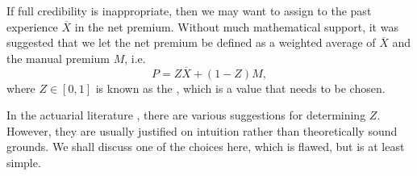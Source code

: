 \documentclass[notoc,notitlepage]{tufte-book}
\begin{document}
If full credibility is inappropriate, then we may want to assign  to the past experience $\overline{X}$ in the net premium. Without
much mathematical support, it was suggested that we let the net premium be
defined as a weighted average of $\overline{X}$ and the manual premium $M$,
i.e.
\begin{equation*}
  P = Z \overline{X} + (1 - Z) M,
\end{equation*}
where $Z \in [0, 1]$ is known as the   , which is a
value that needs to be chosen.

In the actuarial literature \cite{klugman2012}, there are various suggestions
for determining $Z$. However, they are usually justified on intuition rather
than theoretically sound grounds. We shall discuss one of the choices here,
which is flawed, but is at least simple.
\end{document}
